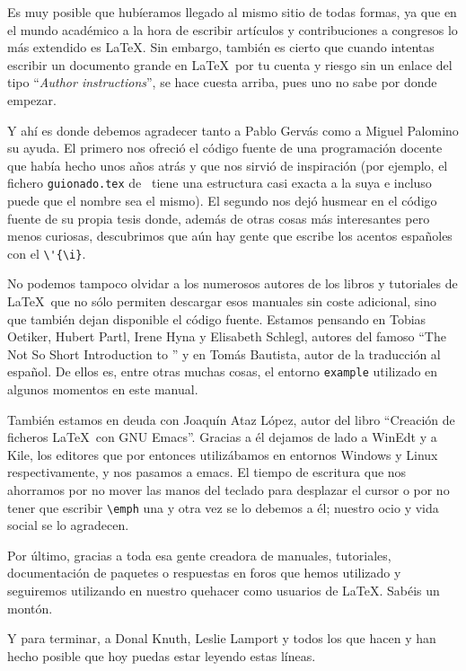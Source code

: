 Es muy posible que hubíeramos llegado al mismo sitio de todas formas,
ya que en el mundo académico a la hora de escribir artículos y
contribuciones a congresos lo más extendido es \LaTeX. Sin embargo,
también es cierto que cuando intentas escribir un documento grande
en \LaTeX\ por tu cuenta y riesgo sin un enlace del tipo ``\emph{Author
  instructions}'', se hace cuesta arriba, pues uno no sabe por donde
empezar.

Y ahí es donde debemos agradecer tanto a Pablo Gervás como a Miguel
Palomino su ayuda. El primero nos ofreció el código fuente de una
programación docente que había hecho unos años atrás y que nos sirvió
de inspiración (por ejemplo, el fichero \texttt{guionado.tex} de
\texis\ tiene una estructura casi exacta a la suya e incluso puede
que el nombre sea el mismo). El segundo nos dejó husmear en el código
fuente de su propia tesis donde, además de otras cosas más
interesantes pero menos curiosas, descubrimos que aún hay gente que
escribe los acentos españoles con el \verb+\'{\i}+.

No podemos tampoco olvidar a los numerosos autores de los libros y
tutoriales de \LaTeX\ que no sólo permiten descargar esos manuales sin
coste adicional, sino que también dejan disponible el código fuente.
Estamos pensando en Tobias Oetiker, Hubert Partl, Irene Hyna y
Elisabeth Schlegl, autores del famoso ``The Not So Short Introduction
to \LaTeXe'' y en Tomás Bautista, autor de la traducción al español. De
ellos es, entre otras muchas cosas, el entorno \texttt{example}
utilizado en algunos momentos en este manual.

También estamos en deuda con Joaquín Ataz López, autor del libro
``Creación de ficheros \LaTeX\ con {GNU} Emacs''. Gracias a él dejamos
de lado a WinEdt y a Kile, los editores que por entonces utilizábamos
en entornos Windows y Linux respectivamente, y nos pasamos a emacs. El
tiempo de escritura que nos ahorramos por no mover las manos del
teclado para desplazar el cursor o por no tener que escribir
\verb+\emph+ una y otra vez se lo debemos a él; nuestro ocio y vida
social se lo agradecen.

Por último, gracias a toda esa gente creadora de manuales, tutoriales,
documentación de paquetes o respuestas en foros que hemos utilizado y
seguiremos utilizando en nuestro quehacer como usuarios de
\LaTeX. Sabéis un montón.

Y para terminar, a Donal Knuth, Leslie Lamport y todos los que hacen y
han hecho posible que hoy puedas estar leyendo estas líneas.

\endinput
